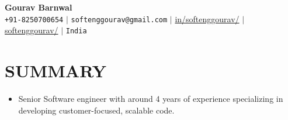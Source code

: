 \documentclass[letterpaper,11pt]{article}
\newcommand{\resumeSubHeadingListStart}{\begin{itemize}[leftmargin=0in, label={}]}
\newcommand{\resumeSubHeadingListEnd}{\end{itemize}}
\newcommand{\resumeItem}[1]{
    \item\small{
            {#1 \vspace{-1pt}}
    }
}
\begin{document}
\begin{center}
\textbf{\Huge Gourav Barnwal} \\ \vspace{5pt}
\small \faPhone* \texttt{+91-8250700654} \hspace{1pt} $|$
\hspace{1pt} \faEnvelope \hspace{2pt} \texttt{softenggourav@gmail.com} \hspace{1pt} $|$
\hspace{1pt} \faLinkedin \hspace{2pt} \href{https://www.linkedin.com/in/softenggourav/}{in/softenggourav/} $|$
\hspace{1pt} \faGithub \hspace{2pt} \href{https://github.com/softenggourav}{softenggourav/} $|$
\hspace{1pt} \faMapMarker* \hspace{2pt}\texttt{India}
\\ \vspace{-3pt}
\end{center}
\section{SUMMARY}
\resumeSubHeadingListStart
\resumeItem{Senior Software engineer with around 4 years of experience specializing in developing customer-focused, scalable code.}
\resumeSubHeadingListEnd
\end{document}

